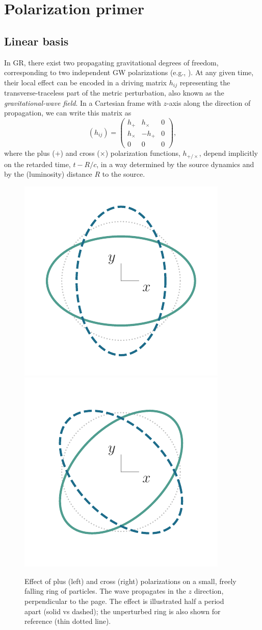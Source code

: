 \documentclass[aps,prd,twocolumn,superscriptaddress,preprintnumbers,floatfix,nofootinbib]{revtex4-2}
\newcommand{\beq}{\begin{equation}}
\newcommand{\eeq}{\end{equation}}
\begin{document}
\section{Polarization primer}

\subsection{Linear basis}
\label{sec:linear}

In GR, there exist two propagating gravitational degrees of freedom, corresponding to two independent GW polarizations (e.g., \cite{Thorne1983,Thorne:1987af,Poisson2014,BT}).
At any given time, their local effect can be encoded in a driving matrix $h_{ij}$ representing the transverse-traceless part of the metric perturbation, also known as the \emph{gravitational-wave field}.
In a Cartesian frame with $z$-axis along the direction of propagation, we can write this matrix as
\beq \label{eq:hij}
(h_{ij}) = \begin{pmatrix}
h_+ & h_\times  & 0 \\
h_\times  & - h_+ & 0  \\
0 & 0 & 0
\end{pmatrix} ,
\eeq
where the plus ($+$) and cross ($\times$) polarization functions, $h_{+/\times}$, depend implicitly on the retarded time, $t - R/c$, in a way determined by the source dynamics and by the (luminosity) distance $R$ to the source.

\begin{figure}
\includegraphics[width=0.4\columnwidth]{pol_ring_plus}
\includegraphics[width=0.4\columnwidth]{pol_ring_cross}
\caption{Effect of plus (left) and cross (right) polarizations on a small, freely falling ring of particles. The wave propagates in the $z$ direction, perpendicular to the page. The effect is illustrated half a period apart (solid vs dashed); the unperturbed ring is also shown for reference (thin dotted line).
}
\label{fig:rings}
\end{figure}
\end{document}
